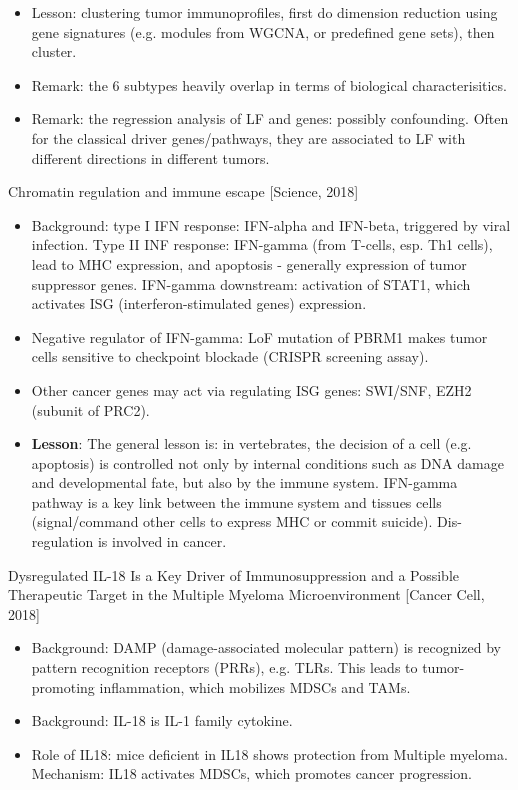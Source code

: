 \documentclass{report}
\begin{document}
\begin{itemize}
	\item Lesson: clustering tumor immunoprofiles, first do dimension reduction using gene signatures (e.g. modules from WGCNA, or predefined gene sets), then cluster. 
	
	\item Remark: the 6 subtypes heavily overlap in terms of biological characterisitics. 
	
	\item Remark: the regression analysis of LF and genes: possibly confounding. Often for the classical driver genes/pathways, they are associated to LF with different directions in different tumors. 
\end{itemize}

Chromatin regulation and immune escape [Science, 2018]
\begin{itemize}
	
	\item Background: type I IFN response: IFN-alpha and IFN-beta, triggered by viral infection. Type II INF response: IFN-gamma (from T-cells, esp. Th1 cells), lead to MHC expression, and apoptosis - generally expression of tumor suppressor genes. IFN-gamma downstream: activation of STAT1, which activates ISG (interferon-stimulated genes) expression. 
	
	\item Negative regulator of IFN-gamma: LoF mutation of PBRM1 makes tumor cells sensitive to checkpoint blockade (CRISPR screening assay). 
	
	\item Other cancer genes may act via regulating ISG genes: SWI/SNF, EZH2 (subunit of PRC2). 
	
	\item \textbf{Lesson}: The general lesson is: in vertebrates, the decision of a cell (e.g. apoptosis) is controlled not only by internal conditions such as DNA damage and developmental fate, but also by the immune system. IFN-gamma pathway is a key link between the immune system and tissues cells (signal/command other cells to express MHC or commit suicide). Dis-regulation is involved in cancer. 
\end{itemize}

Dysregulated IL-18 Is a Key Driver of Immunosuppression and a Possible Therapeutic Target in the Multiple Myeloma Microenvironment [Cancer Cell, 2018]
\begin{itemize}
	\item Background: DAMP (damage-associated molecular pattern) is recognized by pattern recognition receptors (PRRs), e.g. TLRs. This leads to tumor-promoting inflammation, which mobilizes MDSCs and TAMs. 
	
	\item Background: IL-18 is IL-1 family cytokine. 
	
	\item Role of IL18: mice deficient in IL18 shows protection from Multiple myeloma. Mechanism: IL18 activates MDSCs, which promotes cancer progression. 
\end{itemize}
\end{document}
